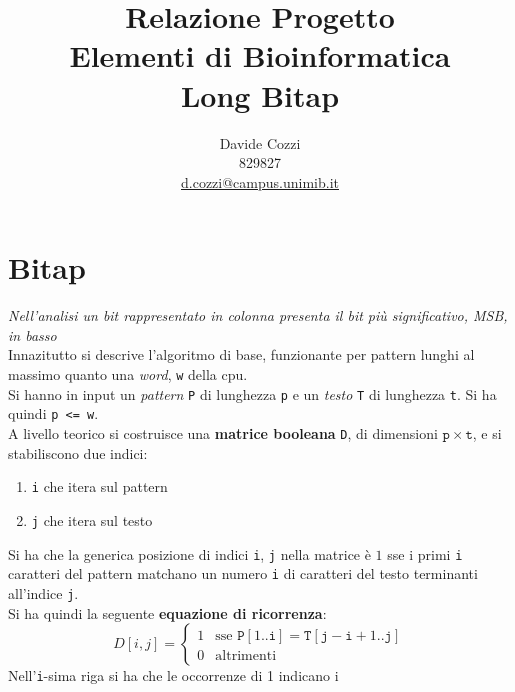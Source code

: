 \documentclass[a4paper,12pt, oneside]{article}
\title{Relazione Progetto\\
  Elementi di Bioinformatica\\
  \large Long Bitap}
\author{Davide Cozzi\\
  829827\\
  \href{mailto:d.cozzi@campus.unimib.it}{d.cozzi@campus.unimib.it}}
\date{}
\begin{document}
\maketitle

\newtheorem{teorema}{Teorema}
\newtheorem{definizione}{Definizione}
\newtheorem{esempio}{Esempio}
\newtheorem{corollario}{Corollario}
\newtheorem{lemma}{Lemma}
\newtheorem{osservazione}{Osservazione}
\newtheorem{nota}{Nota}
\newtheorem{esercizio}{Esercizio}

\renewcommand{\chaptermark}[1]{%
  \markboth{\chaptername
    \ \thechapter.\ #1}{}}
\renewcommand{\sectionmark}[1]{\markright{\thesection.\ #1}}
\allsectionsfont{\centering}

\section*{Bitap}
\textit{Nell'analisi un bit rappresentato in colonna presenta il bit
  più significativo, \textit{MSB}, in basso}\\
Innazitutto si descrive l'algoritmo di base, funzionante per pattern
lunghi al massimo quanto una \textit{word}, \texttt{w} della cpu.\\
Si hanno in input un \textit{pattern} \texttt{P} di lunghezza \texttt{p} e un
\textit{testo} \texttt{T} di lunghezza \texttt{t}. Si ha quindi \texttt{p <= w}.\\
A livello teorico si costruisce una \textbf{matrice booleana}
\texttt{D}, di dimensioni $\mathtt{p}\times \mathtt{t}$, e si stabiliscono due indici:
\begin{enumerate}
  \item \texttt{i} che itera sul pattern
  \item \texttt{j} che itera sul testo
\end{enumerate}
Si ha che la generica posizione di indici \texttt{i}, \texttt{j} nella
matrice è $1$ sse i primi \texttt{i} caratteri del pattern matchano un
numero \texttt{i} di caratteri del testo terminanti all'indice
\texttt{j}.\\
Si ha quindi la seguente \textbf{equazione di ricorrenza}:
\[D[i,j]=
  \begin{cases}
    1 & \mbox{sse } \mathtt{P}[1..\mathtt{i}] =
    \mathtt{T}[\mathtt{j}-\mathtt{i}+1..\mathtt{j}] \\
    0 & \mbox{altrimenti}
  \end{cases}
\]
Nell'\texttt{i}-sima riga si ha che le occorrenze di 1 indicano i
\end{document}
